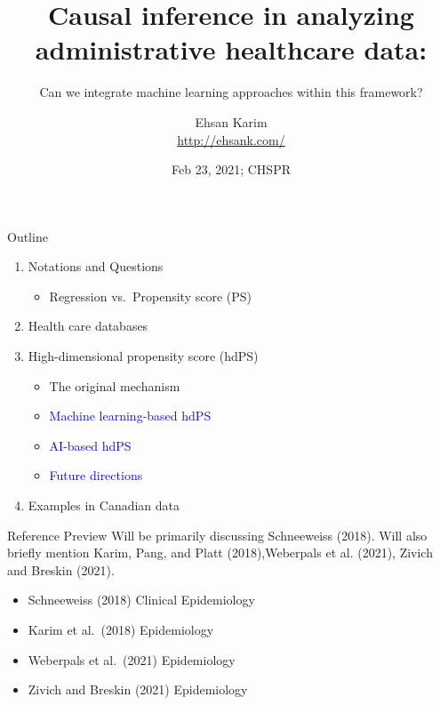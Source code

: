 \documentclass[
  ignorenonframetext,
  aspectratio=169]{beamer}
\title{Causal inference in analyzing administrative healthcare data:}
\subtitle{Can we integrate machine learning approaches within this
framework?}
\author{Ehsan Karim\\
\url{http://ehsank.com/}}
\date{Feb 23, 2021; CHSPR}
\providecommand{\tightlist}{%
  \setlength{\itemsep}{0pt}\setlength{\parskip}{0pt}}
\begin{document}
\frame{\titlepage}

\begin{frame}{Outline}
\protect\hypertarget{outline}{}
\begin{enumerate}
\tightlist
\item
  Notations and Questions

  \begin{itemize}
  \tightlist
  \item
    Regression vs.~Propensity score (PS)
  \end{itemize}
\item
  Health care databases
\item
  High-dimensional propensity score (hdPS)

  \begin{itemize}
  \tightlist
  \item
    The original mechanism
  \item
    \textcolor{blue}{Machine learning-based hdPS}
  \item
    \textcolor{blue}{AI-based hdPS}
  \item
    \textcolor{blue}{Future directions}
  \end{itemize}
\item
  Examples in Canadian data
\end{enumerate}
\end{frame}

\begin{frame}{Reference Preview}
\protect\hypertarget{reference-preview}{}
Will be primarily discussing Schneeweiss (2018). Will also briefly
mention Karim, Pang, and Platt (2018),Weberpals et al. (2021), Zivich
and Breskin (2021).

\begin{itemize}
\tightlist
\item
  Schneeweiss (2018) Clinical Epidemiology
\item
  Karim et al.~(2018) Epidemiology
\item
  Weberpals et al.~(2021) Epidemiology
\item
  Zivich and Breskin (2021) Epidemiology
\end{itemize}
\end{frame}
\end{document}

